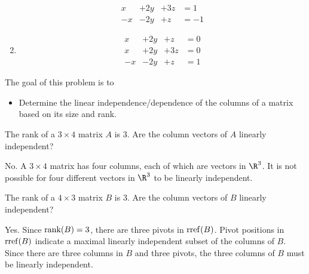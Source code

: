 \begin{parts}
\begin{solution}
\begin{enumerate}
\begin{equation*}
\begin{array}{llll}
								x&+2y&+3z &= 1\\
								-x&-2y&+z &= -1
							\end{array}
						\end{equation*}
					\item
						\begin{equation*}
							\begin{array}{llll}
								x&+2y&+z &= 0\\
								x&+2y&+3z &= 0\\
								-x&-2y&+z &= 1
							\end{array}
						\end{equation*}
				\end{enumerate}
			\end{solution}
	\end{parts}

	\bookonlynewpage
	\question
	\begin{annotation}
		\begin{goals}

			The goal of this problem is to
			\begin{itemize}
				\item Determine the linear independence/dependence of the columns of a matrix
					based on its size and rank.
			\end{itemize}
		\end{goals}
	\end{annotation}
	\begin{parts}
		\item The rank of a $3\times 4$ matrix $A$ is $3$.
			Are the column vectors of $A$ linearly independent?
			\begin{solution}
				No. A $3 \times 4$ matrix has four columns, each of which are
				vectors in $\R^3$. It is not possible for four different vectors
				in $\R^3$ to be linearly independent.
			\end{solution}
		\item The rank of a $4\times 3$ matrix $B$ is $3$.
			Are the column vectors of $B$ linearly independent?
			\begin{solution}
				Yes. Since $\operatorname{rank}(B)=3$, there are three pivots in $\operatorname{rref}(B)$.
				Pivot positions in $\operatorname{rref}(B)$ indicate a maximal linearly
				independent subset of the columns of $B$. Since there are three
				columns in $B$ and three pivots, the three columns of $B$ must be
				linearly independent.
			\end{solution}
	\end{parts}


